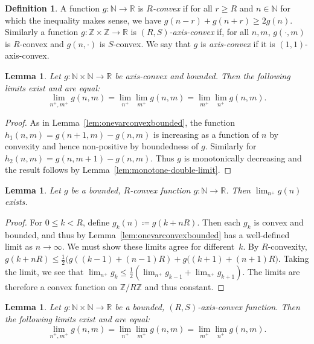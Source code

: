 \documentclass[11pt]{amsart}
\numberwithin{equation}{section}
\numberwithin{figure}{section}
\newtheorem{lemma}[theorem]{Lemma}
\theoremstyle{definition}
\newtheorem{definition}[theorem]{Definition}
\theoremstyle{plain}
\newcommand\bbN{\ensuremath{\mathbb{N}}}
\newcommand\bbZ{\ensuremath{\mathbb{Z}}}
\newcommand\bbR{\ensuremath{\mathbb{R}}}
\begin{document}
\begin{definition}
  A function $g \colon \bbN \to \bbR$ is \emph{$R$-convex}
  if for all $r \ge R$ and $n \in \bbN$ for which the inequality makes
  sense, we have $g(n-r) + g(n+r) \geq
  2 g(n)$. Similarly a
  function $g \colon \mathbb{Z} \times \mathbb{Z} \to \mathbb{R}$ is
  \emph{$(R,S)$-axis-convex} if, for all $n,m$, $g(\cdot, m)$ is
  $R$-convex and $g(n, \cdot)$ is $S$-convex. We say that $g$ is
  \emph{axis-convex} if it is $(1,1)$-axis-convex.
\end{definition}
 
 \begin{lemma}
   Let $g \colon \mathbb{N} \times \mathbb{N} \to \mathbb{R}$ be axis-convex and bounded. Then the following limits exist and are equal:
   \[\lim_{n^+,m^+} g(n,m) = \lim_{n^+} \lim_{m^+} g(n,m) = \lim_{m^+} \lim_{n^+} g(n,m).\]
 \end{lemma}
\begin{proof}
  As in Lemma~\ref{lem:onevarconvexbounded}, the function $h_1(n,m) =
  g(n+1,m) - g(n,m)$ is increasing as a function of $n$ by convexity
  and hence non-positive by boundedness of $g$. Similarly for
  $h_2(n,m) = g(n,m+1) - g(n,m)$. Thus $g$ is monotonically decreasing
  and the result follows by Lemma~\ref{lem:monotone-double-limit}.
\end{proof}

\begin{lemma}
  Let $g$ be a bounded, $R$-convex function
  $g \colon \bbN \to \bbR$. Then $\lim_{n^+} g(n)$ exists.
 \label{lem:limexistrmidconvex}
\end{lemma}
\begin{proof}
  For $0 \le k < R$, define $g_k(n) \coloneqq g(k + nR)$. Then each
  $g_k$ is convex and bounded, and thus by
  Lemma~\ref{lem:onevarconvexbounded} has a well-defined limit as
  $n \to \infty$. We must show these limits agree for different~$k$.
  By $R$-convexity,
  $g(k + nR) \le \frac{1}{2} \bigl(g((k-1) + (n-1)R) + g((k+1) +
  (n+1)R\bigr)$. Taking the limit, we see that
  $\lim_{n^+} g_k \le \frac{1}{2} (\lim_{n^+} g_{k-1} + \lim_{n^+}
  g_{k+1})$. The limits are therefore a convex function on $\bbZ/R\bbZ$ and
  thus constant.
\end{proof}
 
\begin{lemma}
  Let $g \colon \mathbb{N} \times \mathbb{N} \to \mathbb{R}$ be a
  bounded, $(R,S)$-axis-convex function. Then the
  following limits exist and are equal:
  \[
    \lim_{n^+,m^+} g(n,m) = \lim_{n^+} \lim_{m^+} g(n,m) = \lim_{m^+}
    \lim_{n^+} g(n,m).
  \]
  \label{lem:limexistrmidconvextwovar}
\end{lemma}
\end{document}
